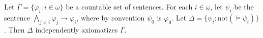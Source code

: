 Let $\Gamma = \{\varphi_i : i \in \omega\}$ be a countable set of sentences. For each $i \in \omega$, let $\psi_i$ be the sentence $\bigwedge_{j < i} \varphi_j \rightarrow \varphi_i$, where by convention $\psi_0$ is $\varphi_0$. Let $\Delta = \{\psi_i : \text{not}(\models \psi_i)\}$. Then $\Delta$ independently axiomatizes $\Gamma$.
